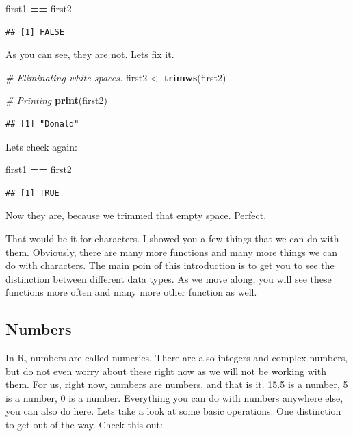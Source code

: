 \documentclass[]{book}
\newenvironment{Shaded}{\begin{snugshade}}{\end{snugshade}}
\newcommand{\CommentTok}[1]{\textcolor[rgb]{0.56,0.35,0.01}{\textit{#1}}}
\newcommand{\KeywordTok}[1]{\textcolor[rgb]{0.13,0.29,0.53}{\textbf{#1}}}
\newcommand{\NormalTok}[1]{#1}
\newcommand{\OperatorTok}[1]{\textcolor[rgb]{0.81,0.36,0.00}{\textbf{#1}}}
\newcommand{\StringTok}[1]{\textcolor[rgb]{0.31,0.60,0.02}{#1}}
\begin{document}
\begin{Shaded}
\begin{Highlighting}[]
\NormalTok{first1 }\OperatorTok{==}\StringTok{ }\NormalTok{first2}
\end{Highlighting}
\end{Shaded}

\begin{verbatim}
## [1] FALSE
\end{verbatim}

As you can see, they are not. Lets fix it.

\begin{Shaded}
\begin{Highlighting}[]
\CommentTok{# Eliminating white spaces.}
\NormalTok{first2 <-}\StringTok{ }\KeywordTok{trimws}\NormalTok{(first2)}

\CommentTok{# Printing}
\KeywordTok{print}\NormalTok{(first2)}
\end{Highlighting}
\end{Shaded}

\begin{verbatim}
## [1] "Donald"
\end{verbatim}

Lets check again:

\begin{Shaded}
\begin{Highlighting}[]
\NormalTok{first1 }\OperatorTok{==}\StringTok{ }\NormalTok{first2}
\end{Highlighting}
\end{Shaded}

\begin{verbatim}
## [1] TRUE
\end{verbatim}

Now they are, because we trimmed that empty space. Perfect.

That would be it for characters. I showed you a few things that we can do with them. Obviously, there are many more functions and many more things we can do with characters. The main poin of this introduction is to get you to see the distinction between different data types. As we move along, you will see these functions more often and many more other function as well.

\hypertarget{numbers}{%
\subsection{Numbers}\label{numbers}}

In R, numbers are called numerics. There are also integers and complex numbers, but do not even worry about these right now as we will not be working with them. For us, right now, numbers are numbers, and that is it. 15.5 is a number, 5 is a number, 0 is a number. Everything you can do with numbers anywhere else, you can also do here. Lets take a look at some basic operations. One distinction to get out of the way. Check this out:
\end{document}
